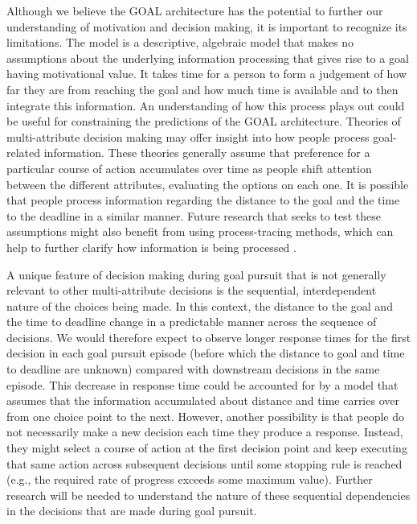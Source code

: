 \documentclass[a4paper,doc,natbib,donotrepeattitle]{apa6}
\begin{document}
Although we believe the GOAL architecture has the potential to further our understanding of motivation and decision making, it is important to recognize its limitations. The model is a descriptive, algebraic model that makes no assumptions about the underlying information processing that gives rise to a goal having motivational value. It takes time for a person to form a judgement of how far they are from reaching the goal and how much time is available and to then integrate this information. An understanding of how this process plays out could be useful for constraining the predictions of the GOAL architecture. Theories of multi-attribute decision making  \citep{Roe2001,Noguchi2018,Trueblood2015,Bhatia2013,Usher2004} may offer insight into how people process goal-related information. These theories generally assume that preference for a particular course of action accumulates over time as people shift attention between the different attributes, evaluating the options on each one. It is possible that people process information regarding the distance to the goal and the time to the deadline in a similar manner. Future research that seeks to test these assumptions might also benefit from using process-tracing methods, which can help to further clarify how information is being processed \citep{Schulte-Mecklenbeck2017}.

A unique feature of decision making during goal pursuit that is not generally relevant to other multi-attribute decisions is the sequential, interdependent nature of the choices being made. In this context, the distance to the goal and the time to deadline change in a predictable manner across the sequence of decisions. We would therefore expect to observe longer response times for the first decision in each goal pursuit episode (before which the distance to goal and time to deadline are unknown) compared with downstream decisions in the same episode. This decrease in response time could be accounted for by a model that assumes that the information accumulated about distance and time carries over from one choice point to the next. However, another possibility is that people do not necessarily make a new decision each time they produce a response. Instead, they might select a course of action at the first decision point and keep executing that same action across subsequent decisions until some stopping rule is reached (e.g., the required rate of progress exceeds some maximum value). Further research will be needed to understand the nature of these sequential dependencies in the decisions that are made during goal pursuit.
\end{document}
